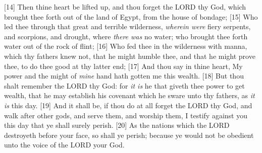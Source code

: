 [14] \textcolor[rgb]{0.00,0.00,1.00}{Then thine heart be lifted up, and thou forget the LORD thy God, which brought thee forth out of the land of Egypt, from the house of bondage;}
[15] \textcolor[rgb]{0.00,0.00,1.00}{Who led thee through that great and terrible wilderness, \emph{wherein were} fiery serpents, and scorpions, and drought, where \emph{there was} no water; who brought thee forth water out of the rock of flint;}
[16] \textcolor[rgb]{0.00,0.00,1.00}{Who fed thee in the wilderness with manna, which thy fathers knew not, that he might humble thee, and that he might prove thee, to do thee good at thy latter end;}
[17] \textcolor[rgb]{0.00,0.00,1.00}{And thou say in thine heart, My power and the might of \emph{mine} hand hath gotten me this wealth.}
[18] \textcolor[rgb]{0.00,0.00,1.00}{But thou shalt remember the LORD thy God: for \emph{it is} he that giveth thee power to get wealth, that he may establish his covenant which he sware unto thy fathers, as \emph{it is} this day.}
[19] \textcolor[rgb]{0.00,0.00,1.00}{And it shall be, if thou do at all forget the LORD thy God, and walk after other gods, and serve them, and worship them, I testify against you this day that ye shall surely perish.}
[20] \textcolor[rgb]{0.00,0.00,1.00}{As the nations which the LORD destroyeth before your face, so shall ye perish; because ye would not be obedient unto the voice of the LORD your God.}
\newpage
